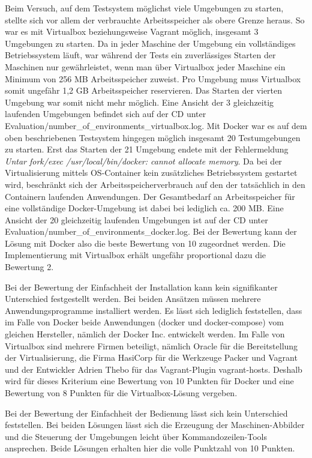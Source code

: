 Beim Versuch, auf dem Testsystem möglichst viele Umgebungen zu starten, stellte sich vor allem der verbrauchte Arbeitsspeicher als obere Grenze heraus. So war es mit Virtualbox beziehungsweise Vagrant möglich, insgesamt 3 Umgebungen zu starten. Da in jeder Maschine der Umgebung ein vollständiges Betriebssystem läuft, war während der Tests ein zuverlässiges Starten der Maschinen nur gewährleistet, wenn man über Virtualbox jeder Maschine ein Minimum von 256 MB Arbeitsspeicher zuweist. Pro Umgebung muss Virtualbox somit ungefähr 1,2 GB Arbeitsspeicher reservieren. Das Starten der vierten Umgebung war somit nicht mehr möglich. Eine Ansicht der 3 gleichzeitig laufenden Umgebungen befindet sich auf der CD unter Evaluation/number\_of\_environments\_virtualbox.log. Mit Docker war es auf dem oben beschriebenen Testsystem hingegen möglich insgesamt 20 Testumgebungen zu starten. Erst das Starten der 21 Umgebung endete mit der Fehlermeldung \textit{Untar fork/exec /usr/local/bin/docker: cannot allocate memory}. Da bei der Virtualisierung mittels OS-Container kein zusätzliches Betriebssystem gestartet wird, beschränkt sich der Arbeitsspeicherverbrauch auf den der tatsächlich in den Containern laufenden Anwendungen. Der Gesamtbedarf an Arbeitsspeicher für eine vollständige Docker-Umgebung ist dabei bei lediglich ca. 200 MB. Eine Ansicht der 20 gleichzeitig laufenden Umgebungen ist auf der CD unter Evaluation/number\_of\_environments\_docker.log. Bei der Bewertung kann der Lösung mit Docker also die beste Bewertung von 10 zugeordnet werden. Die Implementierung mit Virtualbox erhält ungefähr proportional dazu die Bewertung 2.

Bei der Bewertung der Einfachheit der Installation kann kein signifikanter Unterschied festgestellt werden. Bei beiden Ansätzen müssen mehrere Anwendungsprogramme installiert werden. Es lässt sich lediglich feststellen, dass im Falle von Docker beide Anwendungen (docker und docker-compose) vom gleichen Hersteller, nämlich der Docker Inc. entwickelt werden. Im Falle von Virtualbox sind mehrere Firmen beteiligt, nämlich Oracle für die Bereitstellung der Virtualisierung, die Firma HasiCorp für die Werkzeuge Packer und Vagrant und der Entwickler Adrien Thebo für das Vagrant-Plugin vagrant-hosts. Deshalb wird für dieses Kriterium eine Bewertung von 10 Punkten für Docker und eine Bewertung von 8 Punkten für die Virtualbox-Lösung vergeben.

Bei der Bewertung der Einfachheit der Bedienung lässt sich kein Unterschied feststellen. Bei beiden Lösungen lässt sich die Erzeugung der Maschinen-Abbilder und die Steuerung der Umgebungen leicht über Kommandozeilen-Tools ansprechen. Beide Lösungen erhalten hier die volle Punktzahl von 10 Punkten.

